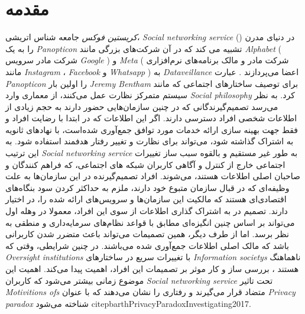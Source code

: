 
\chapter{مقدمه}
\ifDataveillance
  \textit{کریستین فوکس}
  جامعه شناس اتریشی،
  \textit{
    \gls{Social networking service}
  }
  \!({})
  در دنیای مدرن را به یک
  \textit{
    \gls{Panopticon}
  }
  تشبیه می کند   که در آن شرکت‌های بزرگی مانند
  \textit{
    \gls{Alphabet}
  }
  \!(
  شرکت مادر سرویس
  \textit{
    \gls{Google}
  }
  \!)
  و
  \textit{
    \gls{Meta}
  }
  \!(
  \!شرکت مادر و مالک برنامه‌های نرم‌افزاری مانند
  \textit{
    \gls{Instagram}
  }،
  \textit{
    \gls{Facebook}
  }
  و
  \textit{
    \gls{Whatsapp}
  }
  \!)
  به
  \textit{
    \gls{Dataveillance}
  }
  اعضا می‌پردازند
  \!\citep{romelePanopticismNotEnough2017a}.
  عبارت
  \textit{
    \gls{Panopticon}
  }
  را اولین بار
  \textit{
    \gls{Jeremy Bentham}
  }
  \!
  \citep{benthamPanopticonInspectionHouseContaining1791}
  برای توصیف ساختار‌های اجتماعی که مانند سیستم متمرکز نظارت عمل می‌کنند، از معماری وارد
  \textit{
    \gls{Social philosophy}
  }
  کرد.
\fi %
به نظر می‌رسد تصمیم‌گیرندگانی که در چنین سازمان‌هایی حضور دارند به حجم زیادی از اطلاعات
شخصی افراد دسترسی دارند. اگر این اطلاعات که در ابتدا با رضایت افراد و فقط جهت بهینه سازی ارائه خدمات مورد توافق جمع‌آوری شده‌است، با نهادهای ثانویه 
به اشتراک گذاشته شود، می‌تواند برای نظارت و تغییر رفتار هدفمند استفاده شود. به این ترتیب 
\textit{
  \gls{Social networking service}
}
به طور غیر مستقیم و بالقوه سبب ساز تغییرات اجتماعی خارج از کنترل و آگاهی کاربران شبکه های اجتماعی، که فراهم کنندگان و صاحبان اصلی
اطلاعات هستند، می‌شوند.
 افراد تصمیم‌گیرنده در این سازمان‌ها به علت وظیفه‌ای که در قبال سازمان
متبوع خود دارند، ملزم به حداکثر کردن سود بنگاه‌های اقتصادی‌ای هستند
که مالکیت این سازمان‌ها و سرویس‌های ارائه شده را، در اختیار
دارند. تصمیم در به اشتراک گذاری اطلاعات از سوی این افراد، معمولا در وهله اول می‌تواند بر اساس چنین انگیزه‌ای مطابق با قواعد نظام‌های سرمایه‌داری و منطقی به نظر برسد.
 اما از طرف دیگر، همین تصمیمات می‌تواند باعث متضرر شدن
کاربرانی باشد که مالک اصلی اطلاعات جمع‌آوری شده می‌باشند. در چنین شرایطی، وقتی که
\textit{
  \glspl{Oversight institution}
}
با تغییرات سریع  در ساختارهای
\textit{
  \glspl{Information society}
}
ناهماهنگ هستند
\!\citep{cavoukianDiscussionPaperPrivacy2009,machovaDiscourseSurveillancePrivacy2021}،
بررسی ساز و کار موثر بر تصمیمات این افراد، اهمیت پیدا می‌کند.
اهمیت  این موضوع زمانی بیشتر می‌شود که کاربران
\textit{
  \gls{Social networking service}
}
تحت تاثیر
\textit{
  \glspl{Motivitions of}
}
متضاد قرار می‌گیرند و رفتاری را نشان می‌دهند که با عنوان
\textit{
  \gls{Privacy paradox}
}
شناخته می‌شود
\!citep{barthPrivacyParadoxInvestigating2017}.

